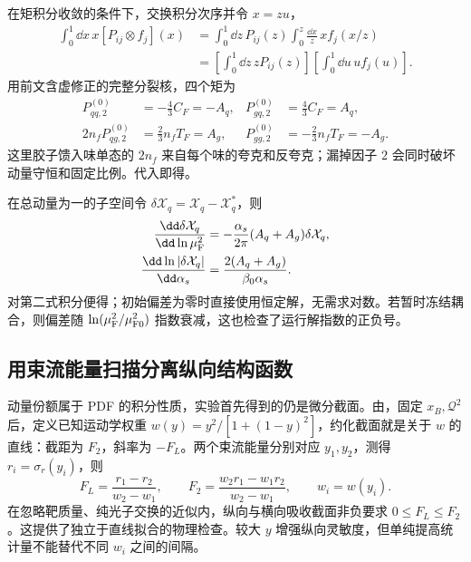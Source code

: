 \begin{derivation}[动量矩的闭合与对角化]
在矩积分收敛的条件下，交换积分次序并令 $x=zu$，
\begin{align*}
 \int_0^1\dd x\,x[P_{ij}\otimes f_j](x)
 &=\int_0^1\dd z\,P_{ij}(z)\int_0^z\frac{\dd x}{z}\,x f_j(x/z)\\
 &=\left[\int_0^1\dd z\,zP_{ij}(z)\right]
   \left[\int_0^1\dd u\,u f_j(u)\right].
\end{align*}
用前文含虚修正的完整分裂核，四个矩为
\begin{align*}
 P_{qq,2}^{(0)}&=-\frac43C_F=-A_q,&
 P_{gq,2}^{(0)}&=\frac43C_F=A_q,\\
 2n_fP_{qg,2}^{(0)}&=\frac23n_fT_F=A_g,&
 P_{gg,2}^{(0)}&=-\frac23n_fT_F=-A_g.
\end{align*}
这里胶子馈入味单态的 $2n_f$ 来自每个味的夸克和反夸克；漏掉因子 $2$ 会同时破坏动量守恒和固定比例。代入即得。

在总动量为一的子空间令 $\delta\mathcal X_q=\mathcal X_q-\mathcal X_q^*$，则
\begin{align*}
 \frac{\dd\delta\mathcal X_q}{\dd\ln\mu_{\rm F}^2}
 &=-\frac{\alpha_s}{2\pi}(A_q+A_g)\delta\mathcal X_q,\\
 \frac{\dd\ln|\delta\mathcal X_q|}{\dd\alpha_s}
 &=\frac{2(A_q+A_g)}{\beta_0\alpha_s}.
\end{align*}
对第二式积分便得；初始偏差为零时直接使用恒定解，无需求对数。若暂时冻结耦合，则偏差随 $\ln(\mu_{\rm F}^2/\mu_{\rm F0}^2)$ 指数衰减，这也检查了运行解指数的正负号。
\end{derivation}

\subsection{用束流能量扫描分离纵向结构函数}
\label{sec:dis-longitudinal-extraction}

动量份额属于 PDF 的积分性质，实验首先得到的仍是微分截面。由，固定 $x_B,\mathcal Q^2$ 后，定义已知运动学权重 $w(y)=y^2/[1+(1-y)^2]$，约化截面就是关于 $w$ 的直线：截距为 $F_2$，斜率为 $-F_L$。两个束流能量分别对应 $y_1,y_2$，测得 $r_i=\sigma_r(y_i)$，则
\begin{equation}
 F_L=\frac{r_1-r_2}{w_2-w_1},\qquad
 F_2=\frac{w_2r_1-w_1r_2}{w_2-w_1},\qquad w_i=w(y_i).
 \label{eq:dis-two-energy-inversion}
\end{equation}
在忽略靶质量、纯光子交换的近似内，纵向与横向吸收截面非负要求 $0\leq F_L\leq F_2$。这提供了独立于直线拟合的物理检查。较大 $y$ 增强纵向灵敏度，但单纯提高统计量不能替代不同 $w_i$ 之间的间隔。

